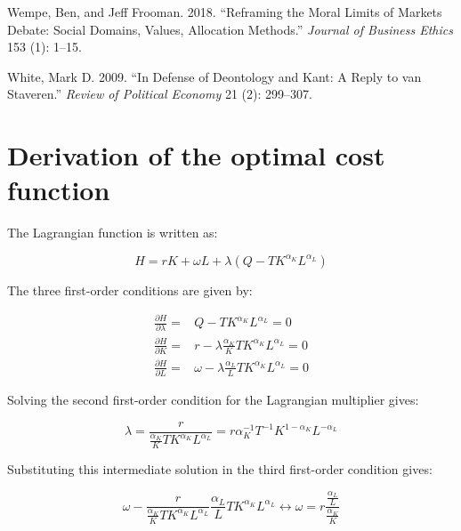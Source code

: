 \documentclass[
]{book}
\newlength{\cslhangindent}
\newlength{\cslentryspacingunit} %
\newenvironment{CSLReferences}[2] %
 {%
  \setlength{\parindent}{0pt}
  \ifodd #1
  \let\oldpar\par
  \def\par{\hangindent=\cslhangindent\oldpar}
  \fi
  \setlength{\parskip}{#2\cslentryspacingunit}
 }%
 {}
\begin{document}
\begin{CSLReferences}{1}{0}
\leavevmode{}%
Wempe, Ben, and Jeff Frooman. 2018. {``Reframing the Moral Limits of Markets Debate: Social Domains, Values, Allocation Methods.''} \emph{Journal of Business Ethics} 153 (1): 1--15.

\leavevmode{}%
White, Mark D. 2009. {``In Defense of Deontology and Kant: A Reply to van Staveren.''} \emph{Review of Political Economy} 21 (2): 299--307.

\end{CSLReferences}

\hypertarget{appendix-appendix}{%
\appendix}


\hypertarget{appderivation}{%
\chapter{Derivation of the optimal cost function}\label{appderivation}}

The Lagrangian function is written as:

\begin{equation}
H = r K + \omega L + \lambda(Q - T K^{\alpha_K} L^{\alpha_L})
\end{equation}

The three first-order conditions are given by:

\begin{align}
  \frac{\partial H}{\partial \lambda} =& Q - T K^{\alpha_K} L^{\alpha_L} = 0\\
  \frac{\partial H}{\partial K} =& r - \lambda \frac{\alpha_K}{K}T K^{\alpha_K} L^{\alpha_L} = 0\\
  \frac{\partial H}{\partial L} =& \omega - \lambda \frac{\alpha_L}{L}T K^{\alpha_K} L^{\alpha_L} =0
\end{align}

Solving the second first-order condition for the Lagrangian multiplier gives:

\begin{equation}
\lambda = \frac{r}{\frac{\alpha_K}{K} T K^{\alpha_K} L^{\alpha_L}} = r \alpha_K^{-1} T^{-1} K^{1-\alpha_K} L^{-\alpha_L}
\end{equation}

Substituting this intermediate solution in the third first-order condition gives:

\begin{equation}
\omega - \frac{r}{\frac{\alpha_K}{K}T K^{\alpha_K} L^{\alpha_L}}\frac{\alpha_L}{L}T K^{\alpha_K} L^{\alpha_L} \longleftrightarrow \omega = r \frac{\frac{\alpha_L}{L}}{\frac{\alpha_K}{K}}
\end{equation}
\end{document}
